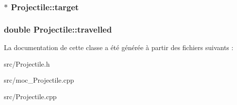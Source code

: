 \label{classProjectile_aae1f5d683c71d152b6a12d922ec4714f}
\hypertarget{classProjectile_ae5273bd2c6550b94f38310b69859b093}{
\subsubsection[{target}]{$\ast$ {\bf Projectile::target}}}
\label{classProjectile_ae5273bd2c6550b94f38310b69859b093}
\hypertarget{classProjectile_a0fc0c0258f36a9347f45d1edb8b767e5}{
\subsubsection[{travelled}]{\setlength{\rightskip}{0pt plus 5cm}double {\bf Projectile::travelled}}}
\label{classProjectile_a0fc0c0258f36a9347f45d1edb8b767e5}


La documentation de cette classe a été générée à partir des fichiers suivants :\begin{DoxyCompactItemize}
\item 
src/Projectile.h\item 
src/moc\_\-Projectile.cpp\item 
src/Projectile.cpp\end{DoxyCompactItemize}

